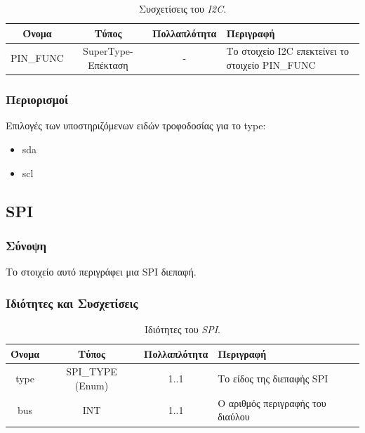 \begin{table}[H]
	\begin{center}
		\caption{Συσχετίσεις του \textit{I2C}.}
		\label{tab:i2c2}
		\begin{tabular}{ | c | c | c| m{5.5cm} | }
			\hline
			\rowcolor{Gray}
			Όνομα & Τύπος & Πολλαπλότητα & Περιγραφή \\
			\hline
			PIN\_FUNC & SuperType-Επέκταση & - &  Το στοιχείο I2C επεκτείνει το στοιχείο PIN\_FUNC \\
			\hline
		\end{tabular}
	\end{center}
\end{table}

\subsubsection*{Περιορισμοί}

\noindent Επιλογές των υποστηριζόμενων ειδών τροφοδοσίας για το type:

\begin{itemize}
	\item sda
	\item scl
\end{itemize}

\subsection{SPI}
\label{subsec:spi}

\subsubsection*{Σύνοψη}

\noindent Το στοιχείο αυτό περιγράφει μια SPI διεπαφή.

\subsubsection*{Ιδιότητες και Συσχετίσεις}

\begin{table}[H]
	\begin{center}
		\caption{Ιδιότητες του \textit{SPI}.}
		\label{tab:spi1}
		\begin{tabular}{ | c | c | c| m{5.5cm} | }
			\hline
			\rowcolor{Gray}
			Όνομα & Τύπος & Πολλαπλότητα & Περιγραφή \\
			\hline
			type & SPI\_TYPE (Enum) & 1..1 & Το είδος της διεπαφής SPI \\
			\hline
			bus & INT & 1..1 & Ο αριθμός περιγραφής του διαύλου \\
			\hline
		\end{tabular}
	\end{center}
\end{table}

